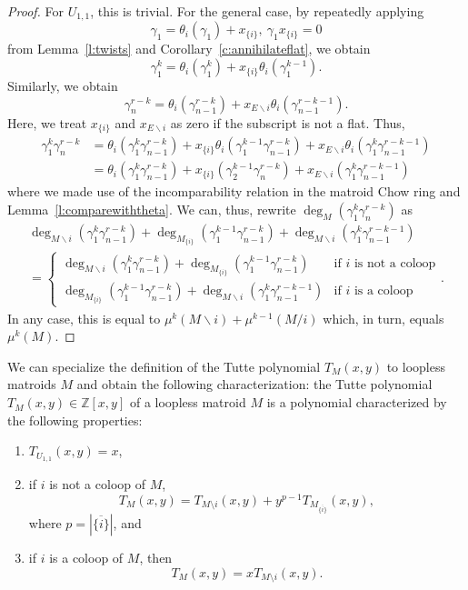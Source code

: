 \documentclass[ALCO,published]{cedram}
\numberwithin{equation}{section}
\numberwithin{figure}{section}
\newcommand{\Z}{\mathbb{Z}}
\begin{document}
\begin{proof}
    For $U_{1,1}$, this is trivial. For the general case,
    by repeatedly applying 
    \[    \gamma_1=\theta_i(\gamma_1)+x_{\{i\}},\ \gamma_1x_{\{i\}}=0\]
    from Lemma~\ref{l:twists} and Corollary~\ref{c:annihilateflat}, we obtain
    \[\gamma_1^k=\theta_i(\gamma_1^k)+x_{\{i\}}\theta_i(\gamma_1^{k-1}).\]
    Similarly, we obtain
    \[\gamma_n^{r-k}=\theta_i(\gamma_{n-1}^{r-k})+x_{E\backslash i}\theta_i(\gamma_{n-1}^{r-k-1}).\]
    Here, we treat $x_{\{i\}}$ and $x_{E\backslash i}$ as zero if the subscript is not a flat.
    Thus,
    \begin{align*}
        \gamma_1^k\gamma_n^{r-k}&=\theta_i(\gamma_1^k\gamma_{n-1}^{r-k})+x_{\{i\}}\theta_i(\gamma_1^{k-1}\gamma_{n-1}^{r-k})
        +x_{E\backslash i}\theta_i(\gamma_1^k\gamma_{n-1}^{r-k-1})\\
        &=\theta_i(\gamma_1^k\gamma_{n-1}^{r-k})+x_{\{i\}}(\gamma_2^{k-1}\gamma_{n}^{r-k})
        +x_{E\backslash i}(\gamma_1^k\gamma_{n-1}^{r-k-1})
    \end{align*}
    where we made use of the incomparability relation in the matroid Chow ring and Lemma~\ref{l:comparewiththeta}.
    We can, thus, rewrite $\deg_M(\gamma_1^k \gamma_n^{r-k})$ as
    \begin{multline*}
    \deg_{M\backslash i}(\gamma_1^k\gamma_{n-1}^{r-k})+\deg_{M_{\{i\}}}(\gamma_1^{k-1}\gamma_{n-1}^{r-k})
        +\deg_{M \backslash i}(\gamma_1^k\gamma_{n-1}^{r-k-1})\\
    =\begin{cases} \deg_{M\backslash i}(\gamma_1^k\gamma_{n-1}^{r-k})+\deg_{M_{\{i\}}}(\gamma_1^{k-1}\gamma_{n-1}^{r-k}) &\text{if $i$ is not a coloop}\\
    \deg_{M_{\{i\}}}(\gamma_1^{k-1}\gamma_{n-1}^{r-k})
        +\deg_{M \backslash i}(\gamma_1^k\gamma_{n-1}^{r-k-1}) 
    &\text{if $i$ is a coloop}    
    \end{cases}.
    \end{multline*}
    In any case, this is equal to $\mu^k(M\backslash i)+\mu^{k-1}(M/i)$ which, in turn, equals $\mu^k(M)$.
\end{proof}


We can specialize the definition of the Tutte polynomial $T_M(x,y)$ to loopless matroids $M$ and obtain the following characterization:
the Tutte polynomial $T_M(x,y)\in\Z[x,y]$ of a loopless matroid $M$ is a polynomial characterized by the following properties:
\begin{enumerate}
    \item $T_{U_{1,1}}(x,y)=x$,
    \item if $i$ is not a coloop of $M$, 
    \[T_M(x,y)=T_{M\setminus i}(x,y)+y^{p-1}T_{M_{\overline{\{i\}}}}(x,y),\]
    where $p=|\overline{\{i\}}|$, and
    \item if $i$ is a coloop of $M$, then 
    \[T_M(x,y)=xT_{M\setminus i}(x,y).\]
\end{enumerate}
\end{document}
